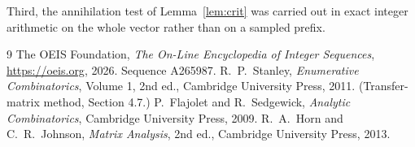 \documentclass[11pt,a4paper]{article}
\theoremstyle{plain}
\theoremstyle{definition}
\begin{document}
Third, the annihilation test of Lemma~\ref{lem:crit} was carried out in exact integer
arithmetic on the whole vector rather than on a sampled prefix.

\begin{thebibliography}{9}
 The OEIS Foundation, \emph{The On-Line Encyclopedia of Integer
Sequences}, \url{https://oeis.org}, 2026. Sequence A265987.
 R.~P.~Stanley, \emph{Enumerative Combinatorics}, Volume 1, 2nd ed.,
Cambridge University Press, 2011. (Transfer-matrix method, Section 4.7.)
 P.~Flajolet and R.~Sedgewick, \emph{Analytic Combinatorics}, Cambridge
University Press, 2009.
 R.~A.~Horn and C.~R.~Johnson, \emph{Matrix Analysis}, 2nd ed., Cambridge
University Press, 2013.
\end{thebibliography}
\end{document}
